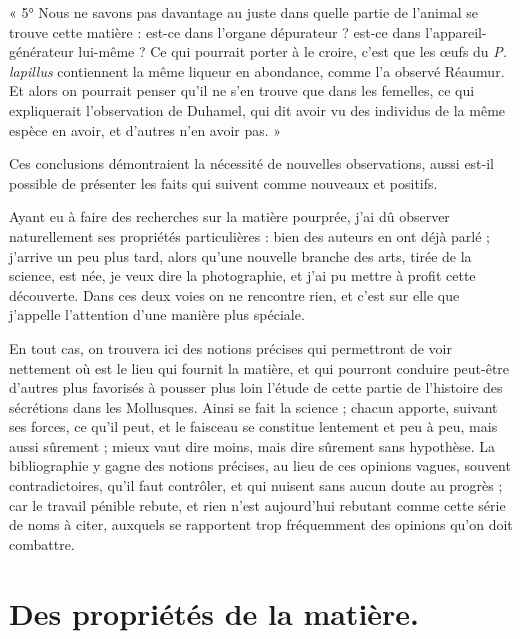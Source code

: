 \documentclass[a4paper, 11pt, oneside, polutonikogreek, french]{article}
\begin{document}
« 5° Nous ne savons pas davantage au juste dans quelle partie de l'animal se trouve cette matière : est-ce dans l'organe dépurateur ? est-ce dans l'appareil-générateur lui-même ? Ce qui pourrait porter à le croire, c'est que les œufs du \emph{P. lapillus} contiennent la même liqueur en abondance, comme l'a observé Réaumur. Et alors on pourrait penser qu'il ne s'en trouve que dans les femelles, ce qui expliquerait l'observation de Duhamel, qui dit avoir vu des individus de la même espèce en avoir, et d'autres n'en avoir pas. »

Ces conclusions démontraient la nécessité de nouvelles observations, aussi est-il possible de présenter les faits qui suivent comme nouveaux et positifs.

Ayant eu à faire des recherches sur la matière pourprée, j'ai dû observer naturellement ses propriétés particulières : bien des auteurs en ont déjà parlé ; j'arrive un peu plus tard, alors qu'une nouvelle branche des arts, tirée de la science, est née, je veux dire la photographie, et j'ai pu mettre à profit cette découverte. Dans ces deux voies on ne rencontre rien, et c'est sur elle que j'appelle l'attention d'une manière plus spéciale.

En tout cas, on trouvera ici des notions précises qui permettront de voir nettement où est le lieu qui fournit la matière, et qui pourront conduire peut-être d'autres plus favorisés à pousser plus loin l'étude de cette partie de l'histoire des sécrétions dans les Mollusques. Ainsi se fait la science ; chacun apporte, suivant ses forces, ce qu'il peut, et le faisceau se constitue lentement et peu à peu, mais aussi sûrement ; mieux vaut dire moins, mais dire sûrement sans hypothèse. La bibliographie y gagne des notions précises, au lieu de ces opinions vagues, souvent contradictoires, qu'il faut contrôler, et qui nuisent sans aucun doute au progrès ; car le travail pénible rebute, et rien n'est aujourd'hui rebutant comme cette série de noms à citer, auxquels se rapportent trop fréquemment des opinions qu'on doit combattre.
\clearpage
\section{Des propriétés de la matière.}
\end{document}
